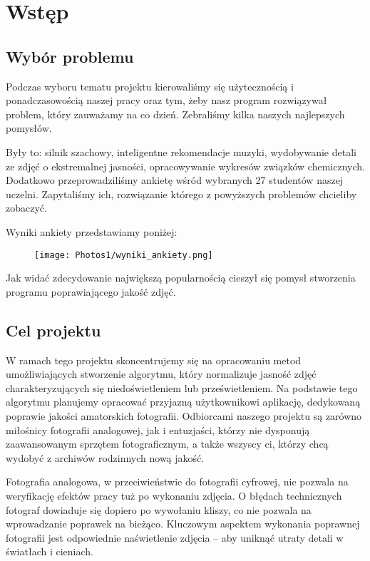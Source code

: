 \documentclass[]{mwart}
\begin{document}
\section{Wstęp}
\subsection{Wybór problemu}
Podczas wyboru tematu projektu kierowaliśmy się użytecznością
i ponadczasowością naszej pracy oraz tym, żeby nasz program
rozwiązywał problem,  który zauważamy na co dzień. Zebraliśmy
kilka naszych najlepszych pomysłów.

Były to: silnik szachowy, inteligentne
rekomendacje muzyki, wydobywanie detali ze zdjęć o ekstremalnej
jasności, opracowywanie wykresów związków chemicznych.
Dodatkowo przeprowadziliśmy ankietę wśród wybranych 27
studentów naszej uczelni. Zapytaliśmy ich, rozwiązanie
którego z powyższych problemów chcieliby zobaczyć.

Wyniki ankiety przedstawiamy poniżej:


\begin{figure}[H]
    \centering
    \texttt{[image: Photos1/wyniki\_ankiety.png]}
\end{figure}




Jak widać zdecydowanie największą popularnością
cieszył się pomysł stworzenia programu poprawiającego jakość zdjęć.

\subsection{Cel projektu}
W ramach tego projektu skoncentrujemy się na opracowaniu metod
umożliwiających stworzenie algorytmu, który normalizuje jasność
zdjęć charakteryzujących się niedoświetleniem lub
prześwietleniem. Na podstawie tego algorytmu planujemy opracować
przyjazną użytkownikowi aplikację, dedykowaną poprawie jakości
amatorskich fotografii. Odbiorcami naszego projektu są zarówno
miłośnicy fotografii analogowej, jak i entuzjaści, którzy nie
dysponują zaawansowanym sprzętem fotograficznym, a także
wszyscy ci, którzy chcą wydobyć z archiwów rodzinnych
nową jakość.

Fotografia analogowa, w przeciwieństwie do fotografii cyfrowej,
nie pozwala na weryfikację efektów pracy tuż po wykonaniu zdjęcia.
O błędach technicznych fotograf dowiaduje się dopiero po wywołaniu
kliszy, co nie pozwala na wprowadzanie poprawek na bieżąco.
Kluczowym aspektem wykonania poprawnej fotografii jest odpowiednie
naświetlenie zdjęcia -- aby uniknąć utraty detali w światłach i cieniach.
\end{document}

